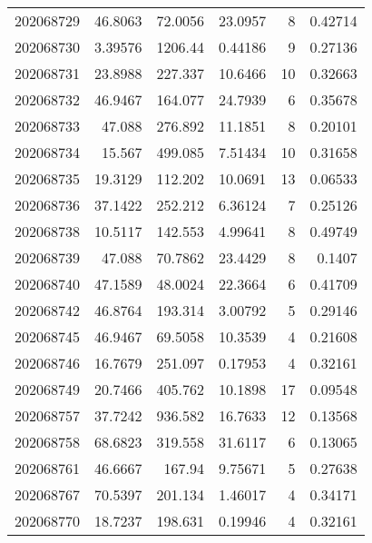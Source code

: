 \begin{tabular}{rrrrrr}
 202068729 &         46.8063  &       72.0056 &           23.0957  &           8 & 0.42714 \\
 202068730 &          3.39576 &     1206.44   &            0.44186 &           9 & 0.27136 \\
 202068731 &         23.8988  &      227.337  &           10.6466  &          10 & 0.32663 \\
 202068732 &         46.9467  &      164.077  &           24.7939  &           6 & 0.35678 \\
 202068733 &         47.088   &      276.892  &           11.1851  &           8 & 0.20101 \\
 202068734 &         15.567   &      499.085  &            7.51434 &          10 & 0.31658 \\
 202068735 &         19.3129  &      112.202  &           10.0691  &          13 & 0.06533 \\
 202068736 &         37.1422  &      252.212  &            6.36124 &           7 & 0.25126 \\
 202068738 &         10.5117  &      142.553  &            4.99641 &           8 & 0.49749 \\
 202068739 &         47.088   &       70.7862 &           23.4429  &           8 & 0.1407  \\
 202068740 &         47.1589  &       48.0024 &           22.3664  &           6 & 0.41709 \\
 202068742 &         46.8764  &      193.314  &            3.00792 &           5 & 0.29146 \\
 202068745 &         46.9467  &       69.5058 &           10.3539  &           4 & 0.21608 \\
 202068746 &         16.7679  &      251.097  &            0.17953 &           4 & 0.32161 \\
 202068749 &         20.7466  &      405.762  &           10.1898  &          17 & 0.09548 \\
 202068757 &         37.7242  &      936.582  &           16.7633  &          12 & 0.13568 \\
 202068758 &         68.6823  &      319.558  &           31.6117  &           6 & 0.13065 \\
 202068761 &         46.6667  &      167.94   &            9.75671 &           5 & 0.27638 \\
 202068767 &         70.5397  &      201.134  &            1.46017 &           4 & 0.34171 \\
 202068770 &         18.7237  &      198.631  &            0.19946 &           4 & 0.32161 \\

\end{tabular}
